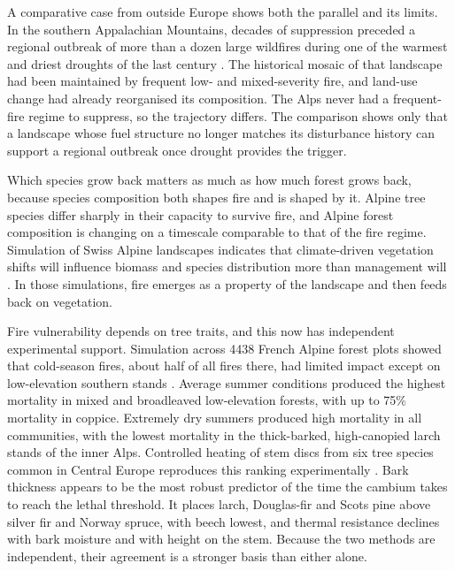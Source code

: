\documentclass[11pt,a4paper]{article}
\begin{document}
A comparative case from outside Europe shows both the parallel and its limits. In the southern Appalachian Mountains, decades of suppression preceded a regional outbreak of more than a dozen large wildfires during one of the warmest and driest droughts of the last century \citep{reilly_drivers_2022}. The historical mosaic of that landscape had been maintained by frequent low- and mixed-severity fire, and land-use change had already reorganised its composition. The Alps never had a frequent-fire regime to suppress, so the trajectory differs. The comparison shows only that a landscape whose fuel structure no longer matches its disturbance history can support a regional outbreak once drought provides the trigger.

Which species grow back matters as much as how much forest grows back, because species composition both shapes fire and is shaped by it. Alpine tree species differ sharply in their capacity to survive fire, and Alpine forest composition is changing on a timescale comparable to that of the fire regime. Simulation of Swiss Alpine landscapes indicates that climate-driven vegetation shifts will influence biomass and species distribution more than management will \citep{schumacher_relative_2006}. In those simulations, fire emerges as a property of the landscape and then feeds back on vegetation.

Fire vulnerability depends on tree traits, and this now has independent experimental support. Simulation across 4438 French Alpine forest plots showed that cold-season fires, about half of all fires there, had limited impact except on low-elevation southern stands \citep{dupire_vulnerability_2019}. Average summer conditions produced the highest mortality in mixed and broadleaved low-elevation forests, with up to 75\% mortality in coppice. Extremely dry summers produced high mortality in all communities, with the lowest mortality in the thick-barked, high-canopied larch stands of the inner Alps. Controlled heating of stem discs from six tree species common in Central Europe reproduces this ranking experimentally \citep{mutterer_bark_2026}. Bark thickness appears to be the most robust predictor of the time the cambium takes to reach the lethal threshold. It places larch, Douglas-fir and Scots pine above silver fir and Norway spruce, with beech lowest, and thermal resistance declines with bark moisture and with height on the stem. Because the two methods are independent, their agreement is a stronger basis than either alone.
\end{document}
